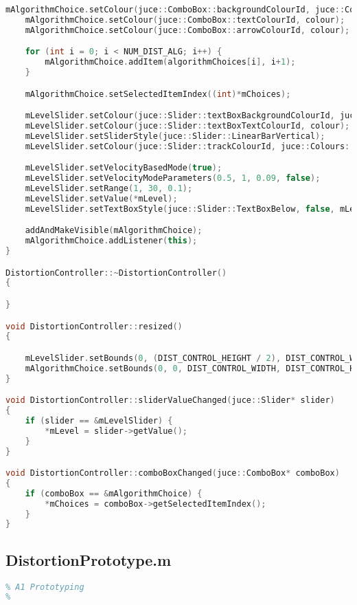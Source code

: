 \documentclass{article}
\begin{document}
\begin{appendix}
\begin{lstlisting}[language=C++]
    mAlgorithmChoice.setColour(juce::ComboBox::backgroundColourId, juce::Colours::black.brighter(0.09));
    mAlgorithmChoice.setColour(juce::ComboBox::textColourId, colour);
    mAlgorithmChoice.setColour(juce::ComboBox::arrowColourId, colour);

    for (int i = 0; i < NUM_DIST_ALG; i++) {
        mAlgorithmChoice.addItem(algorithmChoices[i], i+1);
    }

    mAlgorithmChoice.setSelectedItemIndex((int)*mChoices);

    mLevelSlider.setColour(juce::Slider::textBoxBackgroundColourId, juce::Colours::black.brighter(0.09));
    mLevelSlider.setColour(juce::Slider::textBoxTextColourId, colour);
    mLevelSlider.setSliderStyle(juce::Slider::LinearBarVertical);
    mLevelSlider.setColour(juce::Slider::trackColourId, juce::Colours::transparentWhite);

    mLevelSlider.setVelocityBasedMode(true);
    mLevelSlider.setVelocityModeParameters(0.5, 1, 0.09, false);
    mLevelSlider.setRange(1, 30, 0.1);
    mLevelSlider.setValue(*mLevel);
    mLevelSlider.setTextBoxStyle(juce::Slider::TextBoxBelow, false, mLevelSlider.getTextBoxWidth(), mLevelSlider.getTextBoxHeight());

    addAndMakeVisible(mAlgorithmChoice);
    mAlgorithmChoice.addListener(this);
}

DistortionController::~DistortionController()
{

}

void DistortionController::resized()
{

    mLevelSlider.setBounds(0, (DIST_CONTROL_HEIGHT / 2), DIST_CONTROL_WIDTH, DIST_CONTROL_HEIGHT / 2);
    mAlgorithmChoice.setBounds(0, 0, DIST_CONTROL_WIDTH, DIST_CONTROL_HEIGHT / 2);
}

void DistortionController::sliderValueChanged(juce::Slider* slider)
{
    if (slider == &mLevelSlider) {
        *mLevel = slider->getValue();
    }
}

void DistortionController::comboBoxChanged(juce::ComboBox* comboBox)
{
    if (comboBox == &mAlgorithmChoice) {
        *mChoices = comboBox->getSelectedItemIndex();
    }
}
\end{lstlisting}

\pagebreak
\subsection{DistortionPrototype.m}
\begin{lstlisting}[language=MATLAB]
%
% A1 Prototyping
%


\end{lstlisting}
\end{appendix}
\end{document}

